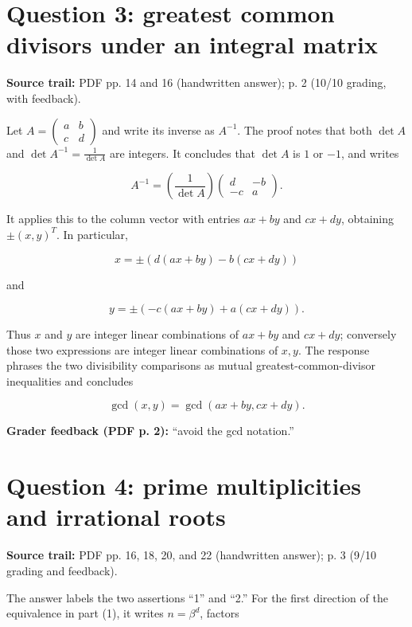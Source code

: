 \section{Question 3: greatest common divisors under an integral matrix}

\textbf{Source trail:} PDF pp. 14 and 16 (handwritten answer); p. 2 (10/10 grading, with feedback).

Let \(A = \begin{pmatrix}
a & b \\
c & d
\end{pmatrix}\) and write its inverse as \(A^{- 1}\). The proof notes that both \(\det A\) and \(\det A^{- 1} = \frac{1}{\det A}\) are integers. It concludes that \(\det A\) is \(1\) or \(- 1\), and writes

\[A^{- 1} = \left( \frac{1}{\det A} \right)\begin{pmatrix}
d & {- b} \\
{- c} & a
\end{pmatrix}.\]

It applies this to the column vector with entries \(ax + by\) and \(cx + dy\), obtaining \(\pm \left( {x,y} \right)^{T}\). In particular,

\[x = \pm \left( {d\left( {ax + by} \right) - b\left( {cx + dy} \right)} \right)\]

and

\[y = \pm \left( {- c\left( {ax + by} \right) + a\left( {cx + dy} \right)} \right).\]

Thus \(x\) and \(y\) are integer linear combinations of \(ax + by\) and \(cx + dy\); conversely those two expressions are integer linear combinations of \(x,y\). The response phrases the two divisibility comparisons as mutual greatest-common-divisor inequalities and concludes

\[\gcd\left( {x,y} \right) = \gcd\left( {ax + by,cx + dy} \right).\]

\textbf{Grader feedback (PDF p. 2):} ``avoid the gcd notation.''

\section{Question 4: prime multiplicities and irrational roots}

\textbf{Source trail:} PDF pp. 16, 18, 20, and 22 (handwritten answer); p. 3 (9/10 grading and feedback).

The answer labels the two assertions ``1'' and ``2.'' For the first direction of the equivalence in part (1), it writes \(n = \beta^{d}\), factors


